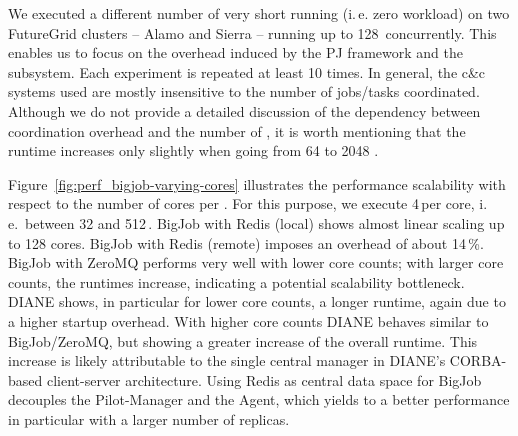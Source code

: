 \documentclass[conference]{IEEEtran}
\begin{document}




We executed a different number of very short running (i.\,e. zero workload)
\cus on two FutureGrid clusters -- Alamo and Sierra --  running up to 128\,\cus
concurrently.  This enables us to focus on the overhead induced by the PJ
framework and the \cc subsystem. Each experiment is repeated at least 10 times.
In general, the c\&c systems used are mostly insensitive to the number of
jobs/tasks coordinated. Although we do not provide a detailed discussion of the dependency
between coordination overhead and the number of \cus, it is worth
mentioning that the runtime increases only slightly when going from 64 to
2048 \cus.

 Figure~\ref{fig:perf_bigjob-varying-cores}
illustrates the performance scalability with respect to the number of cores per
\pilot. For this purpose, we execute 4\,\cus per core, i.\,e.\ between 32 and
512\,\cus. BigJob with Redis (local) shows almost linear scaling up to 128
cores. BigJob with Redis (remote) imposes an overhead of about 14\,\%.  BigJob
with ZeroMQ performs very well with lower core counts; with larger core counts,
the runtimes increase, indicating a potential scalability bottleneck.  DIANE
shows, in particular for lower core counts, a longer runtime, again due to a
higher startup overhead. With higher core counts DIANE behaves similar to
BigJob/ZeroMQ, but showing a greater increase of the overall runtime. This
increase is likely attributable to the single central manager in DIANE's
CORBA-based client-server architecture. Using Redis as central data space for
BigJob decouples the Pilot-Manager and the Agent, which yields to a better
performance in particular with a larger number of replicas.
\end{document}
